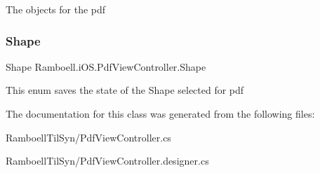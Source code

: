 The objects for the pdf 

\mbox{\label{class_ramboell_1_1i_o_s_1_1_pdf_view_controller_ae9d97ce3c5ade4517fe1191c2dd25707}} 
\subsubsection{\texorpdfstring{Shape}{Shape}}
{\footnotesize\ttfamily Shape Ramboell.\+i\+O\+S.\+Pdf\+View\+Controller.\+Shape}



This enum saves the state of the Shape selected for pdf 



The documentation for this class was generated from the following files\+:\begin{DoxyCompactItemize}
\item 
Ramboell\+Til\+Syn/Pdf\+View\+Controller.\+cs\item 
Ramboell\+Til\+Syn/Pdf\+View\+Controller.\+designer.\+cs\end{DoxyCompactItemize}
